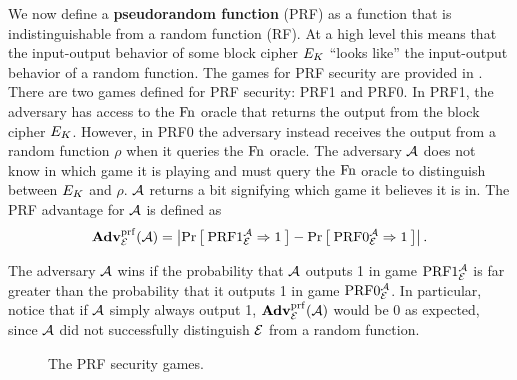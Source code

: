 We now define a \textbf{pseudorandom function} (PRF) as a function that is indistinguishable from a random function (RF). At a high level this means that the input-output behavior of some block cipher $E_K$ ``looks like'' the input-output behavior of a random function. The games for PRF security are provided in . There are two games defined for PRF security: PRF1 and PRF0. In PRF1, the adversary has access to the $\textnormal{Fn}$ oracle that returns the output from the block cipher $E_K$. However, in PRF0 the adversary instead receives the output from a random function $\rho$ when it queries the $\textnormal{Fn}$ oracle. The adversary ${\mathcal A}$ does not know in which game it is playing and must query the $\textnormal{Fn}$ oracle to distinguish between $E_K$ and $\rho$. ${\mathcal A}$ returns a bit signifying which game it believes it is in. The PRF advantage for ${\mathcal A}$ is defined as 
\begin{equation*}
\mathbf{Adv}^{\mathrm{prf}}_{{\cal E}}({\mathcal A}) = \left| \Pr\left[\: \textnormal{PRF}1_{\cal E}^{\mathcal A}\Rightarrow 1 \:\right] 
- \Pr\left[\: \textnormal{PRF}0_{\cal E}^{\mathcal A}\Rightarrow1 \:\right] \right|.
\end{equation*}

The adversary ${\mathcal A}$ wins if the probability that ${\mathcal A}$ outputs 1 in game $\textnormal{PRF}1_{\cal E}^{\mathcal A}$ is far greater than the probability that it outputs 1 in game $\textnormal{PRF}0_{\cal E}^{\mathcal A}$. In particular, notice that if ${\mathcal A}$ simply always output 1, $\mathbf{Adv}^{\mathrm{prf}}_{{\cal E}}({\mathcal A})$ would be 0 as expected, since ${\mathcal A}$ did not successfully distinguish ${\cal E}$ from a random function. 

\begin{figure}
	\centering
\caption{The PRF security games.}
\label{fig:prf}
\end{figure} 

